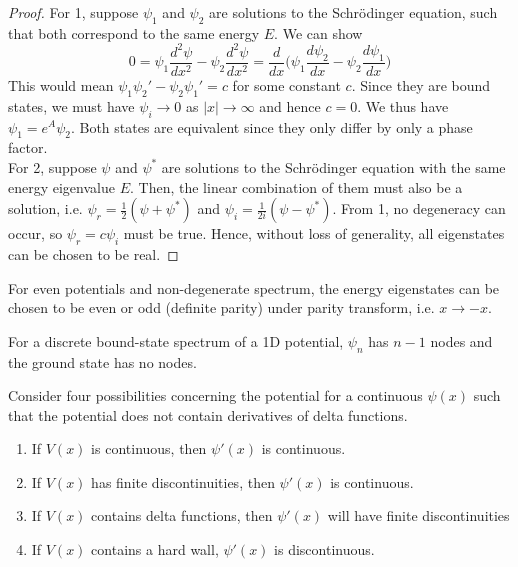 \documentclass[a4paper]{article}
\begin{document}
\begin{proof}
For 1, suppose $\psi_1$ and $\psi_2$ are solutions to the Schr\"{o}dinger equation, such that both correspond to the same energy $E$. We can show
$$0=\psi_1\frac{d^2\psi}{dx^2}-\psi_2\frac{d^2\psi}{dx^2}=\frac{d}{dx}\bigg(\psi_1\frac{d\psi_2}{dx}-\psi_2\frac{d\psi_1}{dx}\bigg)$$
This would mean $\psi_1\psi_2'-\psi_2\psi_1'=c$ for some constant $c$. Since they are bound states, we must have $\psi_i\rightarrow0$ as $|x|\rightarrow\infty$ and hence $c=0$. We thus have $\psi_1=e^A\psi_2$. Both states are equivalent since they only differ by only a phase factor.\\[5pt]
For 2, suppose $\psi$ and $\psi^*$ are solutions to the Schr\"{o}dinger equation with the same energy eigenvalue $E$. Then, the linear combination of them must also be a solution, i.e. $\psi_r=\frac{1}{2}(\psi+\psi^*)$ and $\psi_i=\frac{1}{2i}(\psi-\psi^*)$. From 1, no degeneracy can occur, so $\psi_r=c\psi_i$ must be true. Hence, without loss of generality, all eigenstates can be chosen to be real.
\end{proof}
\begin{cor}
For even potentials and non-degenerate spectrum, the energy eigenstates can be chosen to be even or odd (definite parity) under parity transform, i.e. $x\rightarrow -x$.  
\end{cor}
\begin{cor}
For a discrete bound-state spectrum of a 1D potential, $\psi_n$ has $n-1$ nodes and the ground state has no nodes.
\end{cor}
\begin{thm}
Consider four possibilities concerning the potential for a continuous $\psi(x)$ such that the potential does not contain derivatives of delta functions.
\begin{enumerate}
    \item If $V(x)$ is continuous, then $\psi'(x)$ is continuous.
    \item If $V(x)$ has finite discontinuities, then $\psi'(x)$ is continuous.
    \item If $V(x)$ contains delta functions, then $\psi'(x)$ will have finite discontinuities
    \item If $V(x)$ contains a hard wall, $\psi'(x)$ is discontinuous.
\end{enumerate}
\end{thm}
\end{document}
